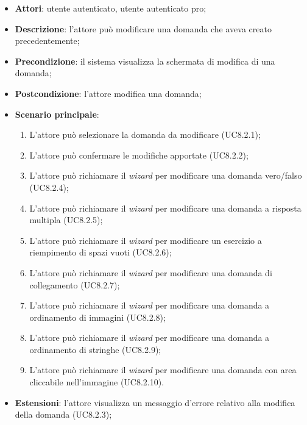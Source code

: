 	\begin{itemize}
		\item
			\textbf{Attori}: utente autenticato, utente autenticato pro;
		\item		
			\textbf{Descrizione}: l'attore può modificare una domanda che aveva creato precedentemente;
		\item
			\textbf{Precondizione}: il sistema visualizza la schermata di modifica di una domanda;
		\item
			\textbf{Postcondizione}: l'attore modifica una domanda;
		\item
			\textbf{Scenario principale}: 
			\begin{enumerate}
				\item
				L'attore può selezionare la domanda da modificare (UC8.2.1);
				\item
				L'attore può confermare le modifiche apportate (UC8.2.2);
				\item
				L'attore può richiamare il \textit{wizard} per modificare una domanda vero/falso (UC8.2.4);
				\item
				L'attore può richiamare il \textit{wizard} per modificare una domanda a risposta multipla (UC8.2.5);
				\item
				L'attore può richiamare il \textit{wizard} per modificare un esercizio a riempimento di spazi vuoti (UC8.2.6);
				\item
				L'attore può richiamare il \textit{wizard} per modificare una domanda di collegamento (UC8.2.7);
				\item
				L'attore può richiamare il \textit{wizard} per modificare una domanda a ordinamento di immagini (UC8.2.8);
				\item
				L'attore può richiamare il \textit{wizard} per modificare una domanda a ordinamento di stringhe (UC8.2.9);
				\item
				L'attore può richiamare il \textit{wizard} per modificare una domanda con area cliccabile nell'immagine (UC8.2.10).
			\end{enumerate}
	       		
	 	\item
			\textbf{Estensioni}: l'attore visualizza un messaggio d'errore relativo alla modifica della domanda (UC8.2.3);
	\end{itemize}
	
